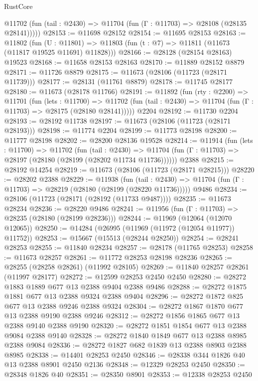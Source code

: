 \begin{lexlean}{RustCore}
\begin{coremodule}
      @11702 (fun (tail : @2430) => @11704 (fun (Γ : @11703) => @28108 (@28135 @28141)))))
@28153 := @11698 @28152
@28154 := @11695 @28153
@28163 := @11802
    (fun (U : @11801) => @11803 (fun (t : @7) => @11811 (@11673 (@11817 @19525 @11691) @11828)))
@28166 := @28128 (@28154 @28163) @19523
@28168 := @11658 @28153 @28163
@28170 := @11889 @28152 @8879
@28171 := @11726 @8879
@28175 := @11673 (@28106 (@11723 (@28171 @11739)))
@28177 := @28131 (@11761 @8879)
@28178 := @11745 @28177
@28180 := @11673 (@28178 @11766)
@28191 := @11892
    (fun (rty : @2200) =>
    @11701
      (fun (lets : @11700) =>
      @11702 (fun (tail : @2430) => @11704 (fun (Γ : @11703) => @28175 (@28180 @28141)))))
    @2204
@28192 := @11730 @2204
@28193 := @28192 @11738
@28197 := @11673 (@28106 (@11723 (@28171 @28193)))
@28198 := @11774 @2204
@28199 := @11773 @28198
@28200 := @11777 @28198
@28202 := @28200 @28136 @19528
@28214 := @11914
    (fun (lets : @11700) =>
    @11702
      (fun (tail : @2430) =>
      @11704 (fun (Γ : @11703) => @28197 (@28180 (@28199 (@28202 @11734 @11736))))))
    @2388
@28215 := @28192 @14254
@28219 := @11673 (@28106 (@11723 (@28171 @28215)))
@28220 := @28202 @2388
@28229 := @11938
    (fun (tail : @2430) => @11704 (fun (Γ : @11703) => @28219 (@28180 (@28199 (@28220 @11736)))))
    @9486
@28234 := @28106 (@11723 (@28171 (@28192 (@11733 @9487))))
@28235 := @11673 @28234
@28236 := @28220 @9486
@28241 := @11956 (fun (Γ : @11703) => @28235 (@28180 (@28199 @28236)))
@28244 := @11969 (@12064 (@12070 @12065))
@28250 := @14284 (@26995 (@11969 (@11972 (@12054 @11977)) @11752))
@28253 := @15667 (@15513 (@28244 @28250))
@28254 := @28241 @28253
@28255 := @11840 @28234
@28257 := @28178 (@11765 @28253)
@28258 := @11673 @28257
@28261 := @11772 @28253 @28198 @28236
@28265 := @28255 (@28258 @28261) (@11992 @28105)
@28269 := @11840 @28257 @28261 (@11997 @28177)
@28272 := @12599 @28253 @2450 @2450
@28280 := @28272 @1883 @1889 @677 @13 @2388 @9404 @2388 @9486
@28288 := @28272 @1875 @1881 @677 @13 @2388 @9324 @2388 @9404
@28296 := @28272 @1872 @825 @677 @13 @2388 @9246 @2388 @9324
@28304 := @28272 @1867 @1870 @677 @13 @2388 @9190 @2388 @9246
@28312 := @28272 @1856 @1865 @677 @13 @2388 @9140 @2388 @9190
@28320 := @28272 @1851 @1854 @677 @13 @2388 @9084 @2388 @9140
@28328 := @28272 @1840 @1849 @677 @13 @2388 @8985 @2388 @9084
@28336 := @28272 @1827 @682 @1839 @13 @2388 @8903 @2388 @8985
@28338 := @14401 @28253 @2450
@28346 := @28338 @344 @1826 @40 @13 @2388 @8901 @2450 @2136
@28348 := @12329 @28253 @2450
@28350 := @28348 @1826 @40
@28351 := @28350 @8901
@28353 := @12338 @28253 @2450

\end{coremodule}
\end{lexlean}
